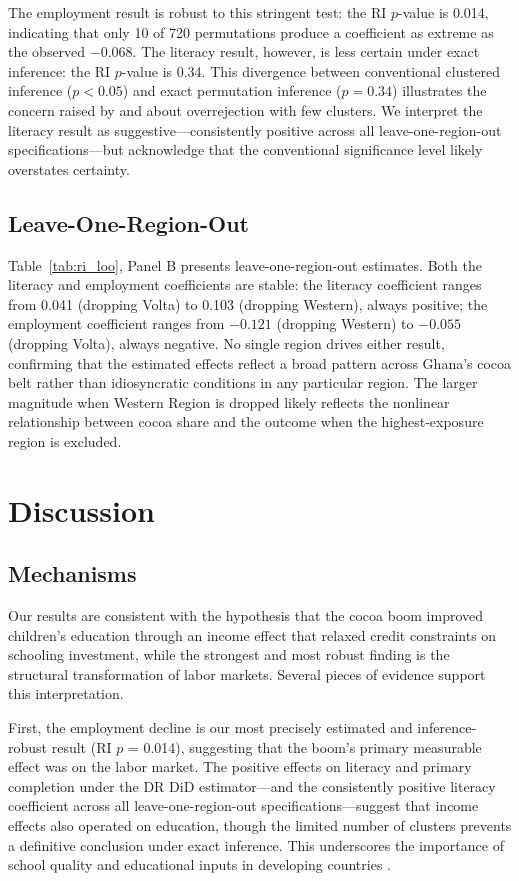 \documentclass[12pt]{article}
\begin{document}
The employment result is robust to this stringent test: the RI $p$-value is 0.014, indicating that only 10 of 720 permutations produce a coefficient as extreme as the observed $-0.068$. The literacy result, however, is less certain under exact inference: the RI $p$-value is 0.34. This divergence between conventional clustered inference ($p < 0.05$) and exact permutation inference ($p = 0.34$) illustrates the concern raised by \citet{cameron2008} and \citet{mackinnon2017} about overrejection with few clusters. We interpret the literacy result as suggestive---consistently positive across all leave-one-region-out specifications---but acknowledge that the conventional significance level likely overstates certainty.

\subsection{Leave-One-Region-Out}

Table~\ref{tab:ri_loo}, Panel B presents leave-one-region-out estimates. Both the literacy and employment coefficients are stable: the literacy coefficient ranges from 0.041 (dropping Volta) to 0.103 (dropping Western), always positive; the employment coefficient ranges from $-0.121$ (dropping Western) to $-0.055$ (dropping Volta), always negative. No single region drives either result, confirming that the estimated effects reflect a broad pattern across Ghana's cocoa belt rather than idiosyncratic conditions in any particular region. The larger magnitude when Western Region is dropped likely reflects the nonlinear relationship between cocoa share and the outcome when the highest-exposure region is excluded.


\section{Discussion}

\subsection{Mechanisms}

Our results are consistent with the hypothesis that the cocoa boom improved children's education through an income effect that relaxed credit constraints on schooling investment, while the strongest and most robust finding is the structural transformation of labor markets. Several pieces of evidence support this interpretation.

First, the employment decline is our most precisely estimated and inference-robust result (RI $p$ = 0.014), suggesting that the boom's primary measurable effect was on the labor market. The positive effects on literacy and primary completion under the DR DiD estimator---and the consistently positive literacy coefficient across all leave-one-region-out specifications---suggest that income effects also operated on education, though the limited number of clusters prevents a definitive conclusion under exact inference. This underscores the importance of school quality and educational inputs in developing countries \citep{glewwe2002}.
\end{document}
